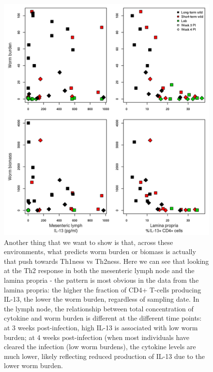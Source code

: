 \documentclass[12pt,reqno,final,pdftex]{amsart}\usepackage[]{graphicx}\usepackage[]{color}
\newenvironment{knitrout}{}{} %
\theoremstyle{plain}
\numberwithin{equation}{part}
\begin{document}
\begin{knitrout}\scriptsize
{}\color{fgcolor}\begin{figure}

\includegraphics[width=\linewidth]{figure/unnamed-chunk-5-1} \hfill{}

\caption[Another thing that we want to show is that, across these environments, what predicts worm burden or biomass is actually that push towards Th1ness vs Th2ness]{Another thing that we want to show is that, across these environments, what predicts worm burden or biomass is actually that push towards Th1ness vs Th2ness. Here we can see that looking at the Th2 response in both the mesenteric lymph node and the lamina propria - the pattern is most obvious in the data from the lamina propria: the higher the fraction of CD4+ T-cells producing IL-13, the lower the worm burden, regardless of sampling date. In the lymph node, the relationship between total concentration of cytokine and worm burden is different at the different time points: at 3 weeks post-infection, high IL-13 is associated with low worm burden; at 4 weeks post-infection (when most individuals have cleared the infection (low worm burdens), the cytokine levels are much lower, likely reflecting reduced production of IL-13 due to the lower worm burden.}\label{fig:unnamed-chunk-5}
\end{figure}


\end{knitrout}
\end{document}
